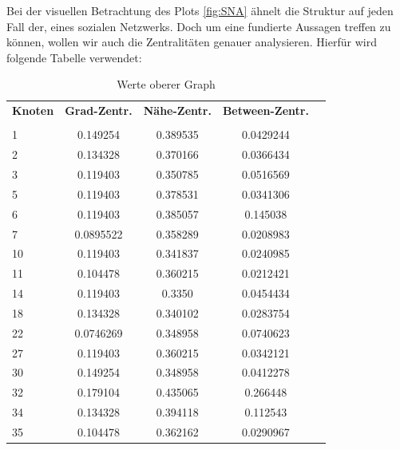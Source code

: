 \FloatBarrier

Bei der visuellen Betrachtung des Plots \ref{fig:SNA} ähnelt die Struktur auf jeden Fall der, eines sozialen Netzwerks. Doch um eine fundierte Aussagen treffen zu können, wollen wir auch die Zentralitäten genauer analysieren. Hierfür wird folgende Tabelle verwendet:

\begin{table}[h!]
\footnotesize
\caption{Werte oberer Graph}
\begin{tabular}{lcccc}\toprule 
\textbf{Knoten} &\textbf{Grad-Zentr.} &\textbf{Nähe-Zentr.}  &\textbf{Between-Zentr.} \\
 &\\\midrule
  1 & 0.149254  & 0.389535 & 0.0429244   \\
  2 & 0.134328  & 0.370166 & 0.0366434   \\
  3 & 0.119403  & 0.350785 & 0.0516569   \\
  5 & 0.119403  & 0.378531 & 0.0341306   \\
  6 & 0.119403  & 0.385057 & 0.145038    \\
  7 & 0.0895522 & 0.358289 & 0.0208983   \\
 10 & 0.119403  & 0.341837 & 0.0240985   \\
 11 & 0.104478  & 0.360215 & 0.0212421   \\
 14 & 0.119403  & 0.3350    & 0.0454434   \\
 18 & 0.134328  & 0.340102 & 0.0283754   \\
 22 & 0.0746269 & 0.348958 & 0.0740623   \\
 27 & 0.119403  & 0.360215 & 0.0342121   \\
 30 & 0.149254  & 0.348958 & 0.0412278   \\
 32 & 0.179104  & 0.435065 & 0.266448    \\
 34 & 0.134328  & 0.394118 & 0.112543    \\
 35 & 0.104478  & 0.362162 & 0.0290967   \\
       

\end{tabular}
\end{table}
